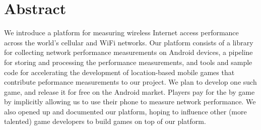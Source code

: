 \section{Abstract}
\label{s:abstract}

We introduce a platform for measuring wireless Internet access performance
across the world's cellular and WiFi networks. Our platform consists of a
library for collecting network performance measurements on Android devices, a
pipeline for storing and processing the performance measurements, and tools and
sample code for accelerating the development of location-based mobile games
that contribute peformance measurements to our project. We plan to develop one
such game, and release it for free on the Android market. Players pay for the
by game by implicitly allowing us to use their phone to measure network
performance. We also opened up and documented our platform, hoping to influence
other (more talented) game developers to build games on top of our platform.

